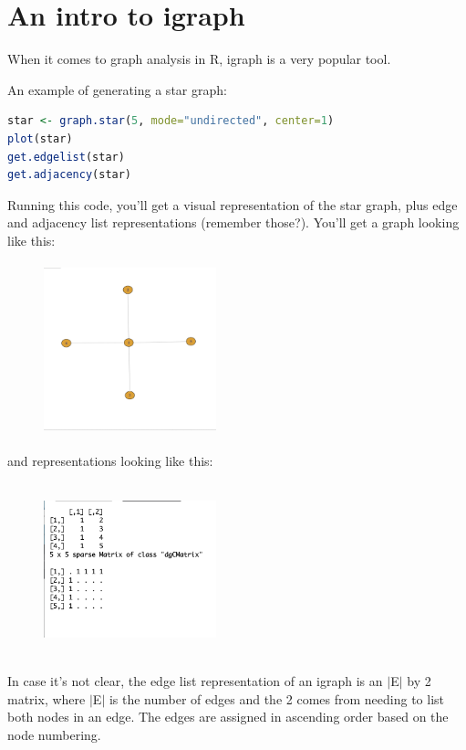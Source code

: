 \section{An intro to igraph}

When it comes to graph analysis in R, igraph is a very popular tool.

An example of generating a star graph:

\begin{lstlisting}[language=R]
star <- graph.star(5, mode="undirected", center=1)
plot(star)
get.edgelist(star)
get.adjacency(star)
\end{lstlisting}

Running this code, you'll get a visual representation of the star graph, plus edge and adjacency list representations (remember those?). You'll get a graph looking like this:

\begin{figure}[h]
\includegraphics[width=5cm, height=5cm]{img/star.png}
\centering
\end{figure}

and representations looking like this:

\begin{figure}[h]
\includegraphics[width=5cm, height=5cm]{img/graph_rep.png}
\centering
\end{figure}

In case it's not clear, the edge list representation of an igraph is an $|$E$|$ by 2 matrix, where $|$E$|$ is the number of edges and the 2 comes from needing to list both nodes in an edge. The edges are assigned in ascending order based on the node numbering.

